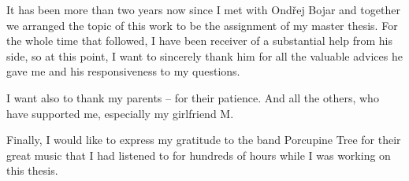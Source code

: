 It has been more than two years now since I met with Ondřej Bojar and together
we arranged the topic of this work to be the assignment of my master thesis.
For the whole time that followed, I have been receiver of a substantial help
from his side, so at this point, I want to sincerely thank him for all the
valuable advices he gave me and his responsiveness to my questions.

I want also to thank my parents -- for their patience. And all the others,
who have supported me, especially my girlfriend M.

Finally, I would like to express my gratitude to the band Porcupine Tree
for their great music that I had listened to for hundreds of hours while
I was working on this thesis.
